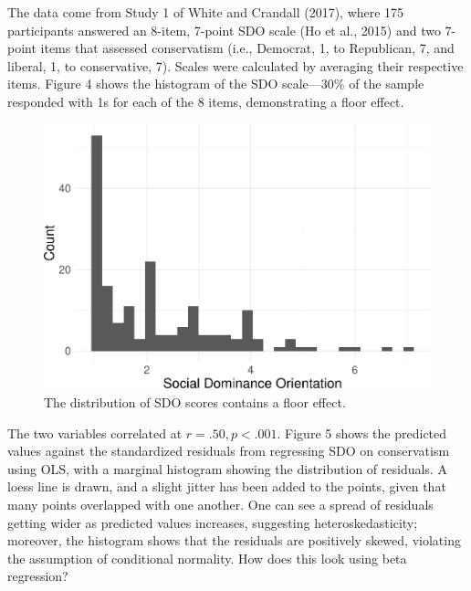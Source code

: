\documentclass[english,man]{apa6}
\theoremstyle{definition}
\theoremstyle{definition}
\theoremstyle{remark}
\begin{document}
The data come from Study 1 of White and Crandall (2017), where 175
participants answered an 8-item, 7-point SDO scale (Ho et al., 2015) and
two 7-point items that assessed conservatism (i.e., Democrat, 1, to
Republican, 7, and liberal, 1, to conservative, 7). Scales were
calculated by averaging their respective items. Figure 4 shows the
histogram of the SDO scale---30\% of the sample responded with 1s for
each of the 8 items, demonstrating a floor effect.

\begin{figure}
\centering
\includegraphics{beta_hurdle_files/figure-latex/unnamed-chunk-11-1.pdf}
\caption{\label{fig:unnamed-chunk-11}The distribution of SDO scores contains
a floor effect.}
\end{figure}

The two variables correlated at \(r = .50, p < .001\). Figure 5 shows
the predicted values against the standardized residuals from regressing
SDO on conservatism using OLS, with a marginal histogram showing the
distribution of residuals. A loess line is drawn, and a slight jitter
has been added to the points, given that many points overlapped with one
another. One can see a spread of residuals getting wider as predicted
values increases, suggesting heteroskedasticity; moreover, the histogram
shows that the residuals are positively skewed, violating the assumption
of conditional normality. How does this look using beta regression?
\end{document}
